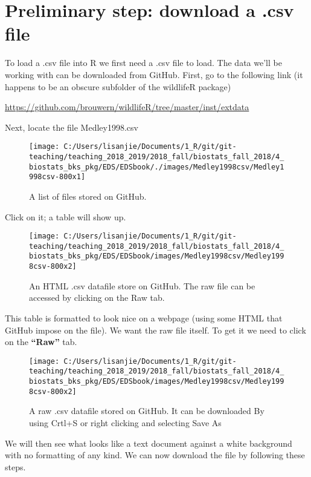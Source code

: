 \documentclass[]{book}
\theoremstyle{definition}
\theoremstyle{definition}
\theoremstyle{definition}
\theoremstyle{remark}
\begin{document}
\section{Preliminary step: download a .csv
file}\label{preliminary-step-download-a-.csv-file}

To load a .csv file into R we first need a .csv file to load. The data
we'll be working with can be downloaded from GitHub. First, go to the
following link (it happens to be an obscure subfolder of the wildlifeR
package)

\url{https://github.com/brouwern/wildlifeR/tree/master/inst/extdata}

Next, locate the file Medley1998.csv

\begin{figure}
\texttt{[image: C:/Users/lisanjie/Documents/1\_R/git/git-teaching/teaching\_2018\_2019/2018\_fall/biostats\_fall\_2018/4\_biostats\_bks\_pkg/EDS/EDSbook/./images/Medley1998csv/Medley1998csv-800x1]} \caption{A list of files stored on GitHub.}\label{fig:unnamed-chunk-91}
\end{figure}

Click on it; a table will show up.

\begin{figure}
\texttt{[image: C:/Users/lisanjie/Documents/1\_R/git/git-teaching/teaching\_2018\_2019/2018\_fall/biostats\_fall\_2018/4\_biostats\_bks\_pkg/EDS/EDSbook/images/Medley1998csv/Medley1998csv-800x2]} \caption{An HTML .csv datafile store on GitHub.  The raw file can be accessed by clicking on the Raw tab.}\label{fig:unnamed-chunk-92}
\end{figure}

This table is formatted to look nice on a webpage (using some HTML that
GitHub impose on the file). We want the raw file itself. To get it we
need to click on the \textbf{``Raw''} tab.

\begin{figure}
\texttt{[image: C:/Users/lisanjie/Documents/1\_R/git/git-teaching/teaching\_2018\_2019/2018\_fall/biostats\_fall\_2018/4\_biostats\_bks\_pkg/EDS/EDSbook/images/Medley1998csv/Medley1998csv-800x2]} \caption{A raw .csv datafile stored on GitHub.  It can be downloaded By using Crtl+S or right clicking and selecting Save As}\label{fig:unnamed-chunk-93}
\end{figure}

We will then see what looks like a text document against a white
background with no formatting of any kind. We can now download the file
by following these steps.
\end{document}
